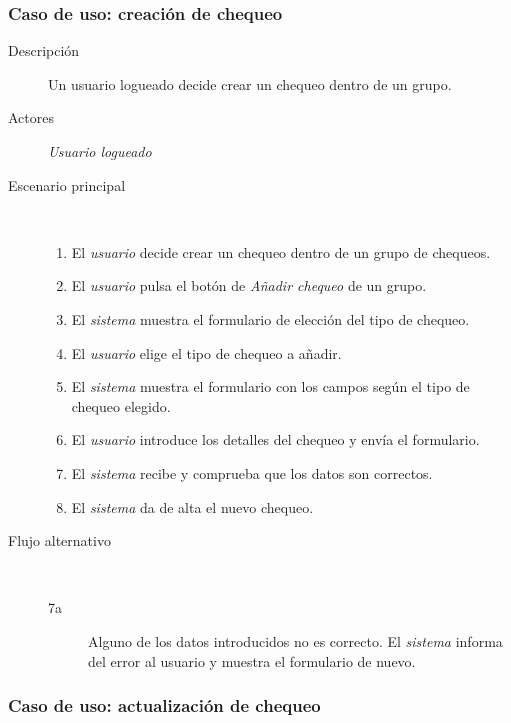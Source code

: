 \subsubsection{Caso de uso: creación de chequeo}

\begin{description}
\item[Descripción] Un usuario logueado decide crear un chequeo dentro de un grupo.
\item[Actores] \textit{Usuario logueado}
\item[Escenario principal] $\quad$
  \begin{enumerate}
  \item El \textit{usuario} decide crear un chequeo dentro de un grupo de chequeos.
  \item El \textit{usuario} pulsa el botón de \textit{Añadir chequeo} de un grupo.
  \item El \textit{sistema} muestra el formulario de elección del tipo de chequeo.
  \item El \textit{usuario} elige el tipo de chequeo a añadir.
  \item El \textit{sistema} muestra el formulario con los campos según el tipo de chequeo elegido.
  \item El \textit{usuario} introduce los detalles del chequeo y envía el formulario.
  \item El \textit{sistema} recibe y comprueba que los datos son correctos.
  \item El \textit{sistema} da de alta el nuevo chequeo.
  \end{enumerate}
\item[Flujo alternativo] $\quad$
  \begin{description}
  \item[7a] Alguno de los datos introducidos no es correcto. El \textit{sistema}
    informa del error al usuario y muestra el formulario de nuevo.
  \end{description}
\end{description}


\subsubsection{Caso de uso: actualización de chequeo}


